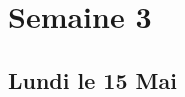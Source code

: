 \documentclass{subfiles}[../main.tex]
\begin{document}
    \section{Semaine 3} %
    \label{sec:Semaine 3}
        \subsection{Lundi le 15 Mai} %
        \label{sub:Lundi le 15 Mai}
        
    
\end{document}
